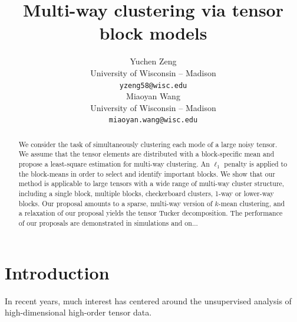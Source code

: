 \documentclass{article}
\title{Multi-way clustering via tensor block models}
\author{%
Yuchen Zeng \\
 University of Wisconsin -- Madison\\
 \texttt{yzeng58@wisc.edu} \\
\And
Miaoyan Wang \\
 University of Wisconsin -- Madison\\
\texttt{miaoyan.wang@wisc.edu} \\
}
\begin{document}
\maketitle

\begin{abstract}
We consider the task of simultaneously clustering each mode of a large noisy tensor. We assume that the tensor elements are distributed with a block-specific mean and propose a least-square estimation for multi-way clustering. An $\ell_1$ penalty is applied to the block-means in order to select and identify important blocks. We show that our method is applicable to large tensors with a wide range of multi-way cluster structure, including a single block, multiple blocks, checkerboard clusters, 1-way or lower-way blocks. Our proposal amounts to a sparse, multi-way version of $k$-mean clustering, and a relaxation of our proposal yields the tensor Tucker decomposition. The performance of our proposals are demonstrated in simulations and on... 
\end{abstract}

\section{Introduction}
In recent years, much interest has centered around the unsupervised analysis of high-dimensional high-order tensor data. 
\end{document}
